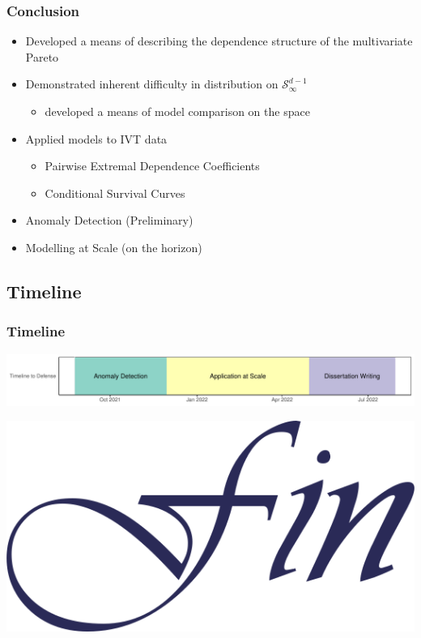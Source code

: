 \documentclass[aspectratio=169]{beamer}
\newlength{\frametextheight}
\begin{document}
\begin{frame}
  \frametitle{Conclusion}
  \begin{itemize}
    \item Developed a means of describing the dependence structure of the multivariate Pareto
    \item Demonstrated inherent difficulty in distribution on $\mathcal{S}_{\infty}^{d-1}$
      \begin{itemize}
        \item developed a means of model comparison on the space
      \end{itemize}
    \item Applied models to IVT data
      \begin{itemize}
        \item Pairwise Extremal Dependence Coefficients
        \item Conditional Survival Curves
      \end{itemize}
    \item Anomaly Detection (Preliminary)
    \item Modelling at Scale (on the horizon)
  \end{itemize}
\end{frame}

\subsection{Timeline}

\begin{frame}
    \frametitle{Timeline}
    \begin{center}
        \includegraphics[width=\textwidth]{./images/timeline}
    \end{center}
\end{frame}


\begin{frame}[plain]
    \begin{center}
        \includegraphics[height=0.7\frametextheight]{./images/fin}
    \end{center}
\end{frame}
\end{document}
